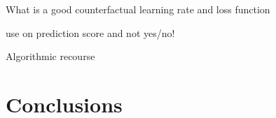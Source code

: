 \documentclass[12pt, smalloffset, compress, aspectratio=1610]{beamer}
\begin{document}
\begin{frame}{What is a good counterfactual}
\label{what-is-a-good-counterfactual}
learning rate and loss function

use on prediction score and not yes/no!
\end{frame}

\begin{frame}{Algorithmic recourse}
\label{algorithmic-recourse}
\end{frame}

\section{Conclusions}\label{conclusions}
\end{document}
